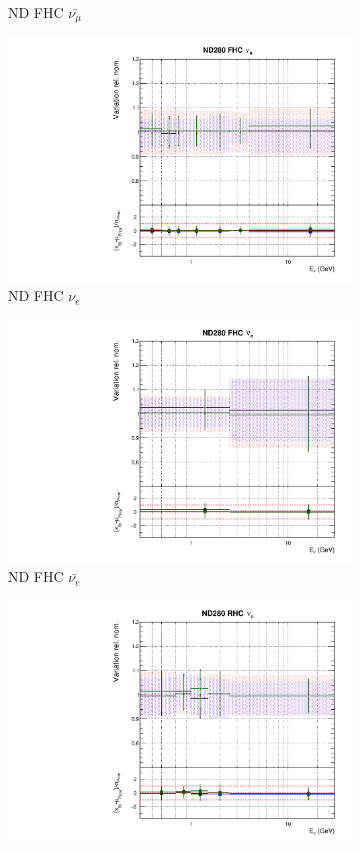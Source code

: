 \begin{figure}[t]
\begin{subfigure}{0.24\textwidth}
  \caption{ND FHC $\bar{\nu_{\mu}}$}
\end{subfigure}
\begin{subfigure}{0.24\textwidth}
  \centering
  \includegraphics[width=0.95\linewidth]{figs/hptpcfitsflux_2}
  \caption{ND FHC $\nu_e$}
\end{subfigure}
\begin{subfigure}{0.24\textwidth}
  \centering
  \includegraphics[width=0.95\linewidth]{figs/hptpcfitsflux_3}
  \caption{ND FHC $\bar{\nu_{e}}$}
\end{subfigure}
\begin{subfigure}{0.24\textwidth}
  \centering
  \includegraphics[width=0.95\linewidth]{figs/hptpcfitsflux_4}

\end{subfigure}
\end{figure}

